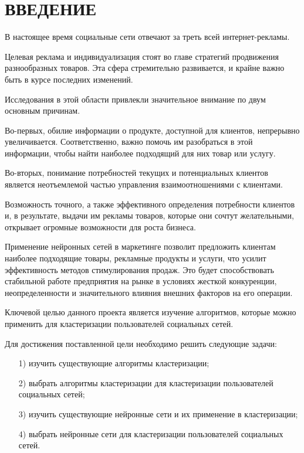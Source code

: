 \section*{ВВЕДЕНИЕ}

В настоящее время социальные сети отвечают за треть всей интернет-рекламы.

Целевая реклама и индивидуализация стоят во главе стратегий продвижения разнообразных товаров. Эта сфера стремительно развивается, и крайне важно быть в курсе последних изменений.

Исследования в этой области привлекли значительное внимание по двум основным причинам. 

Во-первых, обилие информации о продукте, доступной для клиентов, непрерывно увеличивается. Соответственно, важно помочь им разобраться в этой информации, чтобы найти наиболее подходящий для них товар или услугу.

Во-вторых, понимание потребностей текущих и потенциальных клиентов является неотъемлемой частью управления взаимоотношениями с клиентами.

Возможность точного, а также эффективного определения потребности клиентов и, в результате, выдачи им рекламы товаров, которые они сочтут желательными, открывает огромные возможности для роста бизнеса.

Применение нейронных сетей в маркетинге позволит предложить клиентам наиболее подходящие товары, рекламные продукты и услуги, что усилит эффективность методов стимулирования продаж. Это будет способствовать стабильной работе предприятия на рынке в условиях жесткой конкуренции, неопределенности и значительного влияния внешних факторов на его операции.

Ключевой целью данного проекта является изучение алгоритмов, которые можно применить для кластеризации пользователей социальных сетей.

Для достижения поставленной цели необходимо решить следующие задачи:
\begin{itemize}[leftmargin=1.6\parindent]
	\item[1)] изучить существующие алгоритмы кластеризации;
	\item[2)] выбрать алгоритмы кластеризации для кластеризации пользователей социальных сетей;
	\item[3)] изучить существующие нейронные сети и их применение в кластеризации;
    \item[4)] выбрать нейронные сети для кластеризации пользователей социальных сетей.
\end{itemize}

\pagebreak